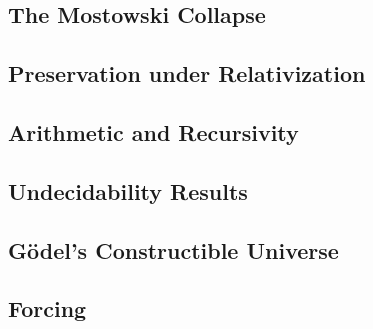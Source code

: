 \documentclass[twocolumn]{article}
\begin{document}
\subsection*{The Mostowski Collapse}
\subsection*{Preservation under Relativization}
\subsection*{Arithmetic and Recursivity}
\subsection*{Undecidability Results}
\subsection*{G\"odel's Constructible Universe}
\subsection*{Forcing}
\end{document}
